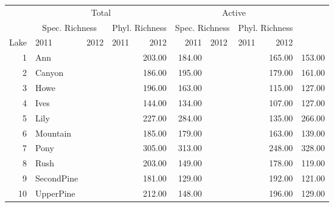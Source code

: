 \begin{table}[ht]
\centering
\begin{tabular}{rlllrrllrr}
  \hline
\hline
  & \multicolumn{4}{c}{Total} & 
                      \multicolumn{4}{c}{Active} \\
 & \multicolumn{2}{c}{Spec. Richness} & 
                      \multicolumn{2}{c}{Phyl. Richness} & 
                      \multicolumn{2}{c}{Spec. Richness} &
                      \multicolumn{2}{c}{Phyl. Richness} \\
 Lake & 2011 & 2012 & 2011 & 2012 & 
                      2011 & 2012 & 2011 & 2012 \\
 \hline
1 & Ann &  &  & 203.00 & 184.00 &  &  & 165.00 & 153.00 \\ 
  2 & Canyon &  &  & 186.00 & 195.00 &  &  & 179.00 & 161.00 \\ 
  3 & Howe &  &  & 196.00 & 163.00 &  &  & 115.00 & 127.00 \\ 
  4 & Ives &  &  & 144.00 & 134.00 &  &  & 107.00 & 127.00 \\ 
  5 & Lily &  &  & 227.00 & 284.00 &  &  & 135.00 & 266.00 \\ 
  6 & Mountain &  &  & 185.00 & 179.00 &  &  & 163.00 & 139.00 \\ 
  7 & Pony &  &  & 305.00 & 313.00 &  &  & 248.00 & 328.00 \\ 
  8 & Rush &  &  & 203.00 & 149.00 &  &  & 178.00 & 119.00 \\ 
  9 & SecondPine &  &  & 181.00 & 129.00 &  &  & 192.00 & 121.00 \\ 
  10 & UpperPine &  &  & 212.00 & 148.00 &  &  & 196.00 & 129.00 \\ 
   \hline
\end{tabular}
\end{table}
